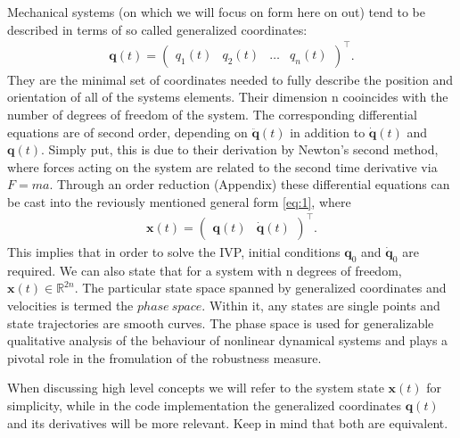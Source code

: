     Mechanical systems (on which we will focus on form here on out) tend to be described in terms of so called generalized coordinates: \begin{gather}\mathbf{q}(t)=\begin{pmatrix}q_1(t)&q_2(t)&\ldots&q_n(t) \end{pmatrix}^\intercal . \end{gather} They are the minimal set of coordinates needed to fully describe the position and orientation of all of the systems elements. Their dimension n cooincides with the number of degrees of freedom of the system. The corresponding differential equations are of second order, depending on $\ddot{\mathbf{q}}(t)$ in addition to $\dot{\mathbf{q}}(t)$ and $\mathbf{q}(t)$. Simply put, this is due to their derivation by Newton's second method, where forces acting on the system are related to the second time derivative via $F = ma$.
    Through an order reduction (Appendix) these differential equations can be cast into the reviously mentioned general form \ref{eq:1}, where \begin{gather*} \mathbf{x}(t) = \begin{pmatrix}\mathbf{q}(t)&\dot{\mathbf{q}}(t)\end{pmatrix}^\intercal .\end{gather*}
    This implies that in order to solve the IVP, initial conditions $\mathbf{q}_0$ and $\dot{\mathbf{q}}_0$ are required. We can also state that for a system with n degrees of freedom, $\mathbf{x}(t) \in \mathbb{R}^{2n}$. The particular state space spanned by generalized coordinates and velocities is termed the $phase\ space$. Within it, any states are single points and state trajectories are smooth curves. The phase space is used for generalizable qualitative analysis of the behaviour of nonlinear dynamical systems and plays a pivotal role in the fromulation of the robustness measure. 

    When discussing high level concepts we will refer to the system state $\mathbf{x}(t)$ for simplicity, while in the code implementation the generalized coordinates $\mathbf{q}(t)$ and its derivatives will be more relevant. Keep in mind that both are equivalent.









